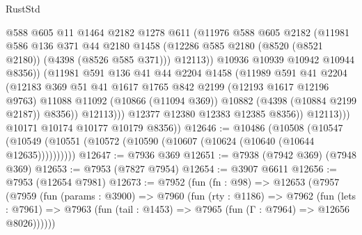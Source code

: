 \begin{lexlean}{RustStd}
\begin{coremodule}
                          @588
                          @605
                          @11
                          @1464
                          @2182
                          @1278
                          @611
                          (@11976
                            @588
                            @605
                            @2182
                            (@11981
                              @586
                              @136
                              @371
                              @44
                              @2180
                              @1458
                              (@12286 @585 @2180 (@8520 (@8521 @2180)) (@4398 (@8526 @585 @371)))
                              @12113))
                          @10936
                          @10939
                          @10942
                          @10944
                          @8356))
                      (@11981
                        @591
                        @136
                        @41
                        @44
                        @2204
                        @1458
                        (@11989
                          @591
                          @41
                          @2204
                          (@12183
                            @369
                            @51
                            @41
                            @1617
                            @1765
                            @842
                            @2199
                            (@12193 @1617 @12196 @9763)
                            @11088
                            @11092
                            (@10866 (@11094 @369))
                            @10882
                            (@4398 (@10884 @2199 @2187))
                            @8356))
                        @12113)))
                  @12377
                  @12380
                  @12383
                  @12385
                  @8356))
              @12113)))
        @10171
        @10174
        @10177
        @10179
        @8356))
@12646 := @10486
    (@10508 (@10547 (@10549 (@10551 (@10572 (@10590 (@10607 (@10624 (@10640 (@10644 @12635))))))))))
@12647 := @7936 @369
@12651 := @7938 (@7942 @369) (@7948 @369)
@12653 := @7953 (@7827 @7954)
@12654 := @3907 @6611
@12656 := @7953 (@12654 @7981)
@12673 := @7952
    (fun (fn : @98) =>
    @12653
      (@7957
        (@7959
          (fun (params : @3900) =>
          @7960
            (fun (rty : @1186) =>
            @7962
              (fun (lets : @7961) =>
              @7963 (fun (tail : @1453) => @7965 (fun (Γ : @7964) => @12656 @8026))))))

\end{coremodule}
\end{lexlean}
